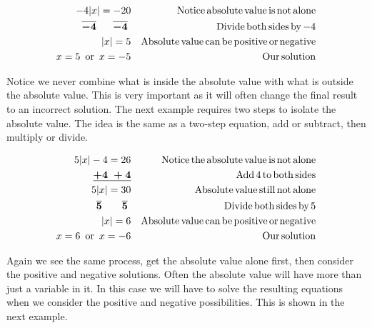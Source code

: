 \begin{example}\label{Lin36}
  \begin{eqnarray*}
    - 4 |x| = - 20 &  & \operatorname{Notice} \operatorname{absolute} \operatorname{value} \operatorname{is}
    \operatorname{not} \operatorname{alone}\\
    \boldsymbol{\overline{- 4} ~~~~~ \overline{- 4}}~ &  & \operatorname{Divide} \operatorname{both}
    \operatorname{sides} \operatorname{by} - 4\\
    |x| = 5 &  & \operatorname{Absolute} \operatorname{value} \operatorname{can} \operatorname{be}
    \operatorname{positive} \operatorname{or} \operatorname{negative}\\
    x = 5 \operatorname{~or~} x = - 5 &  & \operatorname{Our} \operatorname{solution}
  \end{eqnarray*}
\end{example}

 Notice we never combine what is inside the absolute value with what is outside
the absolute value. This is very important as it will often change the final
result to an incorrect solution. The next example requires two steps to
isolate the absolute value. The idea is the same as a two-step equation, add
or subtract, then multiply or divide.

\begin{example}\label{Lin37}
  \begin{eqnarray*}
    5 |x| - 4 = 26 &  & \operatorname{Notice} \operatorname{the} \operatorname{absolute} \operatorname{value}
    \operatorname{is} \operatorname{not} \operatorname{alone}\\
    \underline{\boldsymbol{+ 4 ~+ 4}} &  & \operatorname{Add} 4 \operatorname{to} \operatorname{both}
    \operatorname{sides}\\
    5 |x| = 30 &  & \operatorname{Absolute} \operatorname{value} \operatorname{still} \operatorname{not}
    \operatorname{alone}\\
    \boldsymbol{\overline{5} ~~~~~~ \overline{5}}~ &  & \operatorname{Divide} \operatorname{both}
    \operatorname{sides} \operatorname{by} 5\\
    |x| = 6 &  & \operatorname{Absolute} \operatorname{value} \operatorname{can} \operatorname{be}
    \operatorname{positive} \operatorname{or} \operatorname{negative}\\
    x = 6 \operatorname{~or~} x = - 6 &  & \operatorname{Our} \operatorname{solution}
  \end{eqnarray*}
\end{example}

 Again we see the same process, get the absolute value alone first, then
consider the positive and negative solutions. Often the absolute value will
have more than just a variable in it. In this case we will have to solve the
resulting equations when we consider the positive and negative possibilities.
This is shown in the next example.


